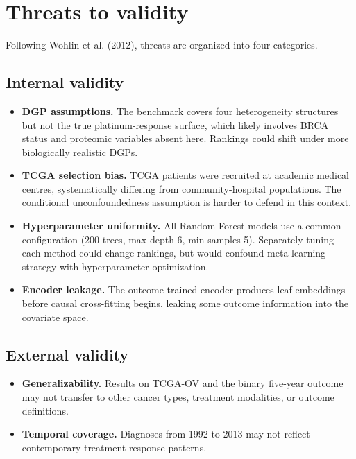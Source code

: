 \section{Threats to validity}\label{threats-to-validity}

Following Wohlin et al. (2012), threats are organized into four categories.

\subsection{Internal validity}\label{internal-validity}

\begin{itemize}
\item
 \textbf{DGP assumptions.} The benchmark covers four heterogeneity structures but not the true platinum-response surface, which likely involves BRCA status and proteomic variables absent here. Rankings could shift under more biologically realistic DGPs.
\item
 \textbf{TCGA selection bias.} TCGA patients were recruited at academic medical centres, systematically differing from community-hospital populations. The conditional unconfoundedness assumption is harder to defend in this context.
\item
 \textbf{Hyperparameter uniformity.} All Random Forest models use a common configuration (200 trees, max depth 6, min samples 5). Separately tuning each method could change rankings, but would confound meta-learning strategy with hyperparameter optimization.
\item
 \textbf{Encoder leakage.} The outcome-trained encoder produces leaf embeddings before causal cross-fitting begins, leaking some outcome information into the covariate space.
\end{itemize}

\subsection{External validity}\label{external-validity}

\begin{itemize}
\item
 \textbf{Generalizability.} Results on TCGA-OV and the binary five-year outcome may not transfer to other cancer types, treatment modalities, or outcome definitions.
\item
 \textbf{Temporal coverage.} Diagnoses from 1992 to 2013 may not reflect contemporary treatment-response patterns.
\end{itemize}

